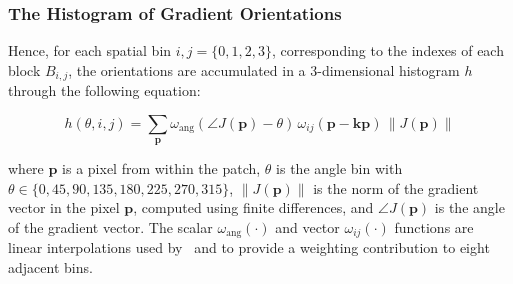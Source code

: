 \documentclass[aspectratio=169]{beamer}
\begin{document}
\begin{frame}
\frametitle{The Histogram of Gradient Orientations}
\begin{center}
Hence, for each spatial bin $ i,j = \{0,1,2,3\} $, corresponding to the indexes of each block $B_{i,j}$,  the orientations are accumulated in a  $3$-dimensional histogram $h$ through the following equation: 
 

\begin{equation}
 h(\theta,i,j) = \sum_{\mathbf{p}} \omega_\mathrm{ang}(\angle J(\mathbf{p}) - \theta)\, \omega_{ij}\left(\mathbf{p} - \mathbf{kp} \right)\, \left\lVert J(\mathbf{p})\right\rVert 
\label{eq:histogram}
\end{equation}

\noindent  where $\mathbf{p}$ is a pixel from within the patch,  $\theta$ is the angle bin with $ \theta \in \{0, 45, 90, 135, 180, 225, 270, 315\} $,  $ \left\lVert J(\mathbf{p}) \right\rVert $ is the norm of the gradient vector in the pixel $\mathbf{p}$, computed using finite differences, and $\angle J(\mathbf{p}) $ is the angle of the gradient vector.  The scalar $ \omega_\mathrm{ang}(\cdot) $  and vector $ \omega_{ij}(\cdot) $ functions are linear interpolations used by~\cite{Lowe2004} and \cite{Vedaldi2010} to provide a weighting contribution to eight adjacent bins. 
\end{center}
\end{frame}
\end{document}
